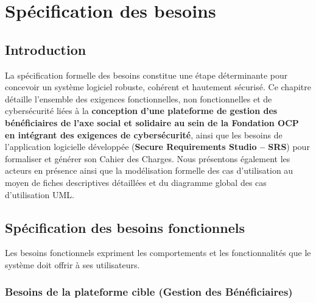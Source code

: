 \chapter{Spécification des besoins}

\section{Introduction}

La spécification formelle des besoins constitue une étape déterminante pour concevoir un système logiciel robuste, cohérent et hautement sécurisé. Ce chapitre détaille l'ensemble des exigences fonctionnelles, non fonctionnelles et de cybersécurité liées à la \textbf{conception d'une plateforme de gestion des bénéficiaires de l'axe social et solidaire au sein de la Fondation OCP en intégrant des exigences de cybersécurité}, ainsi que les besoins de l'application logicielle développée (\textbf{Secure Requirements Studio -- SRS}) pour formaliser et générer son Cahier des Charges. Nous présentons également les acteurs en présence ainsi que la modélisation formelle des cas d'utilisation au moyen de fiches descriptives détaillées et du diagramme global des cas d'utilisation UML.

\section{Spécification des besoins fonctionnels}

Les besoins fonctionnels expriment les comportements et les fonctionnalités que le système doit offrir à ses utilisateurs.

\subsection{Besoins de la plateforme cible (Gestion des Bénéficiaires)}

